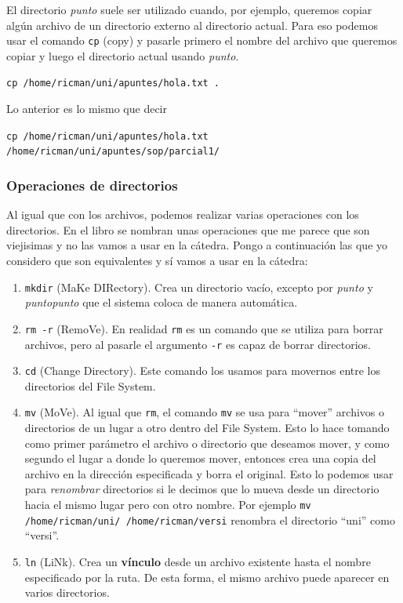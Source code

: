\documentclass[12pt]{article}
\begin{document}
  El directorio \textit{punto} suele ser utilizado cuando, por ejemplo, queremos copiar algún archivo de un directorio externo al directorio actual. Para eso podemos usar el comando \verb|cp| (copy) y pasarle primero el nombre del archivo que queremos copiar y luego el directorio actual usando \textit{punto}.

  \verb|cp /home/ricman/uni/apuntes/hola.txt .|

  Lo anterior es lo mismo que decir 

  \verb|cp /home/ricman/uni/apuntes/hola.txt /home/ricman/uni/apuntes/sop/parcial1/|

  \subsubsection{Operaciones de directorios}
  Al igual que con los archivos, podemos realizar varias operaciones con los directorios. En el libro \parencite{tanenbaum} se nombran unas operaciones que me parece que son viejisimas y no las vamos a usar en la cátedra. Pongo a continuación las que yo considero que son equivalentes y sí vamos a usar en la cátedra:
  \begin{enumerate}[1.]
    \item \verb|mkdir| (MaKe DIRectory). Crea un directorio vacío, excepto por \textit{punto} y \textit{puntopunto} que el sistema coloca de manera automática.

    \item \verb|rm -r| (RemoVe). En realidad \verb|rm| es un comando que se utiliza para borrar archivos, pero al pasarle el argumento \verb|-r| es capaz de borrar directorios.

    \item \verb|cd| (Change Directory). Este comando los usamos para movernos entre los directorios del File System.

    \item \verb|mv| (MoVe). Al igual que \verb|rm|, el comando \verb|mv| se usa para ``mover'' archivos o directorios de un lugar a otro dentro del File System. Esto lo hace tomando como primer parámetro el archivo o directorio que deseamos mover, y como segundo el lugar a donde lo queremos mover, entonces crea una copia del archivo en la dirección especificada y borra el original. Esto lo podemos usar para \textit{renombrar} directorios si le decimos que lo mueva desde un directorio hacia el mismo lugar pero con otro nombre. Por ejemplo \verb|mv /home/ricman/uni/ /home/ricman/versi| renombra el directorio ``uni'' como ``versi''.

    \item \verb|ln| (LiNk). Crea un \textbf{vínculo} desde un archivo existente hasta el nombre especificado por la ruta. De esta forma, el mismo archivo puede aparecer en varios directorios. 
  \end{enumerate}
\end{document}
